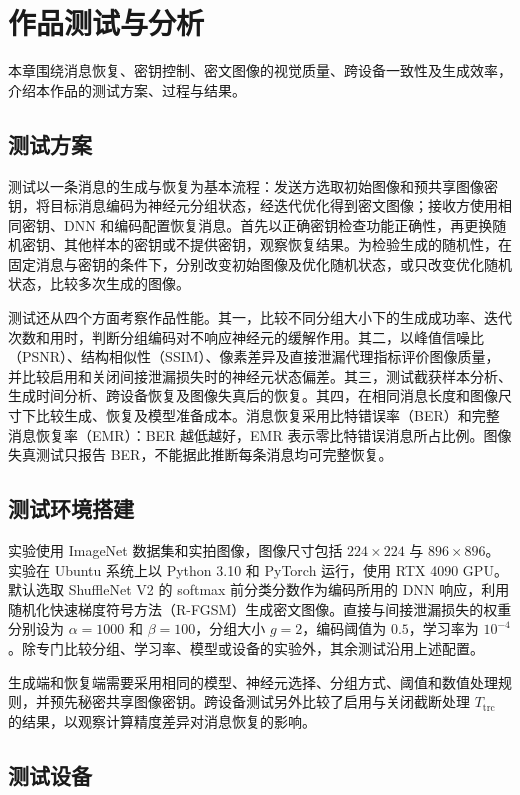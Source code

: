 \section{作品测试与分析}

本章围绕消息恢复、密钥控制、密文图像的视觉质量、跨设备一致性及生成效率，介绍本作品的测试方案、过程与结果。

\subsection{测试方案}

测试以一条消息的生成与恢复为基本流程：发送方选取初始图像和预共享图像密钥，将目标消息编码为神经元分组状态，经迭代优化得到密文图像；接收方使用相同密钥、DNN 和编码配置恢复消息。首先以正确密钥检查功能正确性，再更换随机密钥、其他样本的密钥或不提供密钥，观察恢复结果。为检验生成的随机性，在固定消息与密钥的条件下，分别改变初始图像及优化随机状态，或只改变优化随机状态，比较多次生成的图像。

测试还从四个方面考察作品性能。其一，比较不同分组大小下的生成成功率、迭代次数和用时，判断分组编码对不响应神经元的缓解作用。其二，以峰值信噪比（PSNR）、结构相似性（SSIM）、像素差异及直接泄漏代理指标评价图像质量，并比较启用和关闭间接泄漏损失时的神经元状态偏差。其三，测试截获样本分析、生成时间分析、跨设备恢复及图像失真后的恢复。其四，在相同消息长度和图像尺寸下比较生成、恢复及模型准备成本。消息恢复采用比特错误率（BER）和完整消息恢复率（EMR）：BER 越低越好，EMR 表示零比特错误消息所占比例。图像失真测试只报告 BER，不能据此推断每条消息均可完整恢复。

\subsection{测试环境搭建}

实验使用 ImageNet 数据集和实拍图像，图像尺寸包括 $224\times224$ 与 $896\times896$。实验在 Ubuntu 系统上以 Python 3.10 和 PyTorch 运行，使用 RTX 4090 GPU。默认选取 ShuffleNet V2 的 softmax 前分类分数作为编码所用的 DNN 响应，利用随机化快速梯度符号方法（R-FGSM）生成密文图像。直接与间接泄漏损失的权重分别设为 $\alpha=1000$ 和 $\beta=100$，分组大小 $g=2$，编码阈值为 $0.5$，学习率为 $10^{-4}$。除专门比较分组、学习率、模型或设备的实验外，其余测试沿用上述配置。

生成端和恢复端需要采用相同的模型、神经元选择、分组方式、阈值和数值处理规则，并预先秘密共享图像密钥。跨设备测试另外比较了启用与关闭截断处理 $T_{\mathrm{trc}}$ 的结果，以观察计算精度差异对消息恢复的影响。

\subsection{测试设备}

